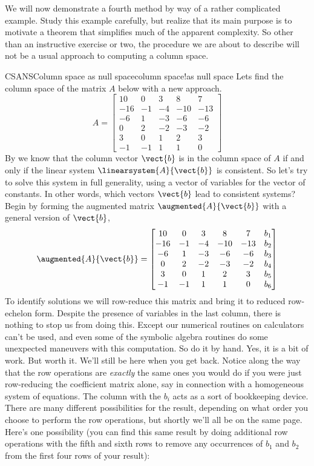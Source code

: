 %
We will now demonstrate a fourth method by way of a rather complicated example.  Study this example carefully, but realize that its main purpose is to motivate a theorem that simplifies much of the apparent complexity.  So other than an instructive exercise or two, the procedure we are about to describe will not be a usual approach to computing a column space.
%
\begin{example}{CSANS}{Column space as null space}{column space!as null space}
Lets find the column space of the matrix $A$ below with a new approach.
%
\begin{equation*}
A=
\begin{bmatrix}
 10 & 0 & 3 & 8 & 7 \\
 -16 & -1 & -4 & -10 & -13 \\
 -6 & 1 & -3 & -6 & -6 \\
 0 & 2 & -2 & -3 & -2 \\
 3 & 0 & 1 & 2 & 3 \\
 -1 & -1 & 1 & 1 & 0
\end{bmatrix}
\end{equation*}
%
By  we know that the column vector $\vect{b}$ is in the column space of $A$ if and only if the linear system $\linearsystem{A}{\vect{b}}$ is consistent.  So let's try to solve this system in full generality, using a vector of variables for the vector of constants.  In other words, which vectors $\vect{b}$ lead to consistent systems?  Begin by forming the augmented matrix $\augmented{A}{\vect{b}}$ with a general version of $\vect{b}$,
%
\begin{equation*}
\augmented{A}{\vect{b}}=
\begin{bmatrix}
 10 & 0 & 3 & 8 & 7 & b_1 \\
 -16 & -1 & -4 & -10 & -13 & b_2 \\
 -6 & 1 & -3 & -6 & -6 & b_3 \\
 0 & 2 & -2 & -3 & -2 & b_4 \\
 3 & 0 & 1 & 2 & 3 & b_ 5\\
 -1 & -1 & 1 & 1 & 0 & b_ 6
\end{bmatrix}
\end{equation*}
%
To identify solutions we will row-reduce this matrix and bring it to reduced row-echelon form.  Despite the presence of variables in the last column, there is nothing to stop us from doing this.  Except our numerical routines on calculators can't be used, and even some of the symbolic algebra routines do some unexpected maneuvers with this computation.  So do it by hand.  Yes, it is a bit of work.  But worth it.  We'll still be here when you get back.  Notice along the way that the row operations are {\em exactly} the same ones you would do if you were just row-reducing the coefficient matrix alone, say in connection with a homogeneous system of equations.  The column with the $b_i$ acts as a sort of bookkeeping device.  There are many different possibilities for the result, depending on what order you choose to perform the row operations, but shortly we'll all be on the same page.  Here's one possibility (you can find this same result by doing additional row operations with the fifth and sixth rows to remove any occurrences of $b_1$ and $b_2$ from the first four rows of your result):

\end{example}
